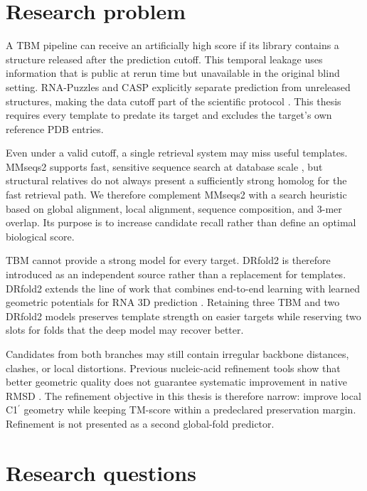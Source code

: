 \documentclass[12pt,a4paper,oneside]{report}
\newcommand{\cprime}{C1$^{\prime}$}
\begin{document}
\section{Research problem}

A TBM pipeline can receive an artificially high score if its library contains a
structure released after the prediction cutoff. This temporal leakage uses information
that is public at rerun time but unavailable in the original blind setting. RNA-Puzzles
and CASP explicitly separate prediction from unreleased structures, making the data
cutoff part of the scientific protocol \cite{rna_puzzles,casp15,competition_paper}.
This thesis requires every template to predate its target and excludes the target's own
reference PDB entries.

Even under a valid cutoff, a single retrieval system may miss useful templates. MMseqs2
supports fast, sensitive sequence search at database scale \cite{mmseqs2}, but structural
relatives do not always present a sufficiently strong homolog for the fast retrieval
path. We therefore complement MMseqs2 with a search heuristic based on global alignment,
local alignment, sequence composition, and 3-mer overlap. Its purpose is to increase
candidate recall rather than define an optimal biological score.

TBM cannot provide a strong model for every target. DRfold2 is therefore introduced as
an independent source rather than a replacement for templates. DRfold2 extends the line
of work that combines end-to-end learning with learned geometric potentials for RNA 3D
prediction \cite{drfold,drfold2}. Retaining three TBM and two DRfold2 models preserves
template strength on easier targets while reserving two slots for folds that the deep
model may recover better.

Candidates from both branches may still contain irregular backbone distances, clashes,
or local distortions. Previous nucleic-acid refinement tools show that better geometric
quality does not guarantee systematic improvement in native RMSD \cite{qrnas,arena}.
The refinement objective in this thesis is therefore narrow: improve local \cprime{}
geometry while keeping TM-score within a predeclared preservation margin. Refinement is
not presented as a second global-fold predictor.

\section{Research questions}
\end{document}
